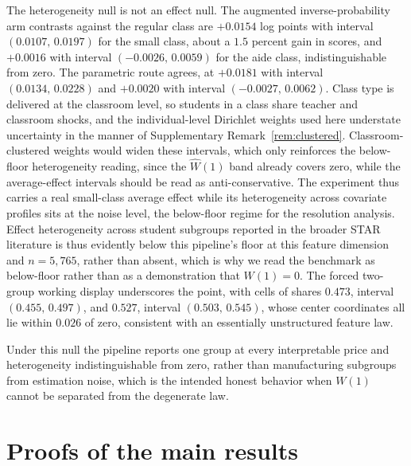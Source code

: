 \documentclass[11pt]{article}
\begin{document}
The heterogeneity null is not an effect null. The augmented inverse-probability arm contrasts against the regular class are $+0.0154$ log points with interval $(0.0107,\,0.0197)$ for the small class, about a $1.5$ percent gain in scores, and $+0.0016$ with interval $(-0.0026,\,0.0059)$ for the aide class, indistinguishable from zero. The parametric route agrees, at $+0.0181$ with interval $(0.0134,\,0.0228)$ and $+0.0020$ with interval $(-0.0027,\,0.0062)$. Class type is delivered at the classroom level, so students in a class share teacher and classroom shocks, and the individual-level Dirichlet weights used here understate uncertainty in the manner of Supplementary Remark~\ref{rem:clustered}. Classroom-clustered weights would widen these intervals, which only reinforces the below-floor heterogeneity reading, since the $\widehat W(1)$ band already covers zero, while the average-effect intervals should be read as anti-conservative. The experiment thus carries a real small-class average effect while its heterogeneity across covariate profiles sits at the noise level, the below-floor regime for the resolution analysis. Effect heterogeneity across student subgroups reported in the broader STAR literature is thus evidently below this pipeline's floor at this feature dimension and $n=5{,}765$, rather than absent, which is why we read the benchmark as below-floor rather than as a demonstration that $W(1)=0$. The forced two-group working display underscores the point, with cells of shares $0.473$, interval $(0.455,\,0.497)$, and $0.527$, interval $(0.503,\,0.545)$, whose center coordinates all lie within $0.026$ of zero, consistent with an essentially unstructured feature law.

Under this null the pipeline reports one group at every interpretable price and heterogeneity indistinguishable from zero, rather than manufacturing subgroups from estimation noise, which is the intended honest behavior when $W(1)$ cannot be separated from the degenerate law.

\section{Proofs of the main results}\label{app:proofs}
\end{document}
